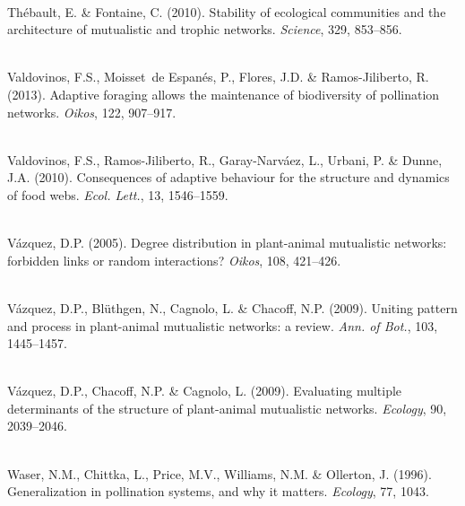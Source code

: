 \documentclass[12pt]{article}
\begin{document}
\begin{thebibliography}{67}
\hspace{0em}\\Th{\'e}bault, E. \& Fontaine, C. (2010).
\newblock Stability of ecological communities and the architecture of
  mutualistic and trophic networks.
\newblock \emph{Science}, 329, 853--856.

\hspace{0em}\\Valdovinos, F.S., Moisset~de Espan{\'e}s, P., Flores, J.D. \&
  Ramos-Jiliberto, R. (2013).
\newblock Adaptive foraging allows the maintenance of biodiversity of
  pollination networks.
\newblock \emph{Oikos}, 122, 907--917.

\hspace{0em}\\Valdovinos, F.S., Ramos-Jiliberto, R., Garay-Narv{\'a}ez, L.,
  Urbani, P. \& Dunne, J.A. (2010).
\newblock Consequences of adaptive behaviour for the structure and dynamics of
  food webs.
\newblock \emph{Ecol. Lett.}, 13, 1546--1559.

\hspace{0em}\\V\'azquez, D.P. (2005).
\newblock Degree distribution in plant-animal mutualistic networks: forbidden
  links or random interactions?
\newblock \emph{Oikos}, 108, 421--426.

\hspace{0em}\\V\'azquez, D.P., Bl{\"u}thgen, N., Cagnolo, L. \& Chacoff, N.P.
  (2009).
\newblock Uniting pattern and process in plant-animal mutualistic networks: a
  review.
\newblock \emph{Ann. of Bot.}, 103, 1445--1457.

\hspace{0em}\\V{\'a}zquez, D.P., Chacoff, N.P. \& Cagnolo, L. (2009).
\newblock Evaluating multiple determinants of the structure of plant-animal
  mutualistic networks.
\newblock \emph{Ecology}, 90, 2039--2046.

\hspace{0em}\\Waser, N.M., Chittka, L., Price, M.V., Williams, N.M. \&
  Ollerton, J. (1996).
\newblock Generalization in pollination systems, and why it matters.
\newblock \emph{Ecology}, 77, 1043.

\end{thebibliography}
\end{document}
